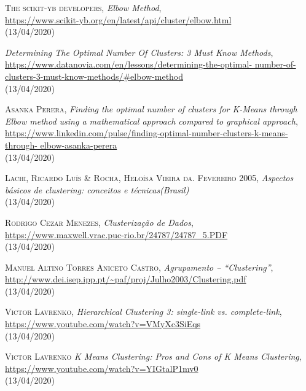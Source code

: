 \documentclass[12pt, a4paper, oneside]{scrreport}
\begin{document}
\pagestyle{empty}
\begin{thebibliography}{9}
\clearpairofpagestyles


\textsc{The scikit-yb developers},
{\em Elbow Method},
\\\url{https://www.scikit-yb.org/en/latest/api/cluster/elbow.html}
\\(13/04/2020)


{\em Determining The Optimal Number Of Clusters: 3 Must Know Methods},
\\\url{https://www.datanovia.com/en/lessons/determining-the-optimal-
number-of-clusters-3-must-know-methods/\#elbow-method}
\\(13/04/2020)


\textsc{Asanka Perera},
{\em Finding the optimal number of clusters for K-Means through Elbow
method using a mathematical approach compared to graphical approach},
\\\url{https://www.linkedin.com/pulse/finding-optimal-number-clusters-k-means-through-
elbow-asanka-perera}
\\(13/04/2020)


\textsc{Lachi, Ricardo Luís \& Rocha, Heloísa Vieira da. Fevereiro 2005},
{\em Aspectos básicos de \textit{clustering}: conceitos e técnicas(Brasil)}
\\(13/04/2020)


\textsc{Rodrigo Cezar Menezes},
{\em Clusterização de Dados},
\\\url{https://www.maxwell.vrac.puc-rio.br/24787/24787_5.PDF}
\\(13/04/2020)


\textsc{Manuel Altino Torres Aniceto Castro},
{\em Agrupamento – “Clustering”},
\\\url{http://www.dei.isep.ipp.pt/~paf/proj/Julho2003/Clustering.pdf}
\\(13/04/2020)



\textsc{Victor Lavrenko},
{\em Hierarchical Clustering 3: single-link vs. complete-link},
\\\url{https://www.youtube.com/watch?v=VMyXc3SiEqs}
\\(13/04/2020)




\textsc{Victor Lavrenko}
{\em K Means Clustering: Pros and Cons of K Means Clustering},
\\\url{https://www.youtube.com/watch?v=YIGtalP1mv0}
\\(13/04/2020)




\end{thebibliography}
\end{document}
